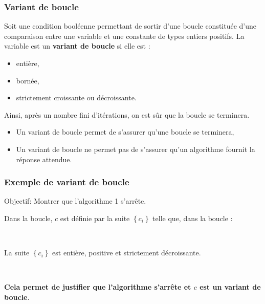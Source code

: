 \begin{frame}[fragile]
\frametitle{Variant de boucle}

\begin{defi}
Soit une condition booléenne permettant de sortir d'une boucle constituée d'une comparaison entre une variable et une constante de types entiers positifs. La variable est un \textbf{variant de boucle} si elle est :
\begin{itemize}
 \item entière,
 \item bornée,
 \item strictement croissante ou décroissante.
\end{itemize}

Ainsi, après un nombre fini d'itérations, on est sûr que la boucle se terminera.
\end{defi}

\begin{rem}
\begin{itemize}
 \item Un variant de boucle permet de s'assurer qu'une boucle se terminera,
 \item Un variant de boucle ne permet pas de s'assurer qu'un algorithme fournit la réponse attendue.
\end{itemize}
\end{rem}
\end{frame}

\begin{frame}[fragile]
\frametitle{Exemple de variant de boucle}
Objectif: Montrer que l'algorithme 1 s'arrête.

Dans la boucle, $c$ est définie par la suite $\left\{c_i \right\}$ telle que, dans la boucle :


~\

La suite $\left\{c_i \right\}$ est entière, positive et strictement décroissante.

~\

\textbf{Cela permet de justifier que l'algorithme s'arrête et $c$ est un variant de boucle}.
\end{frame}

